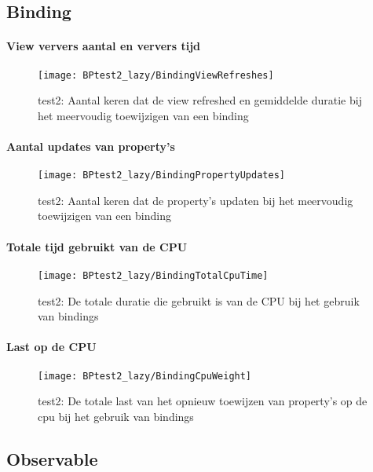 \subsection{Binding}
\paragraph{View ververs aantal en ververs tijd}
\begin{figure}[H]
    \centering
    \texttt{[image: BPtest2\_lazy/BindingViewRefreshes]} 
    \caption{test2: Aantal keren dat de view refreshed en gemiddelde duratie bij het meervoudig toewijzigen van een binding}
    \label{fig:viewRefreshesBinding2}
\end{figure}
\paragraph{Aantal updates van property's}
\begin{figure}[H]
    \centering
    \texttt{[image: BPtest2\_lazy/BindingPropertyUpdates]} 
    \caption{test2: Aantal keren dat de property's updaten bij het meervoudig toewijzigen van een binding}
    \label{fig:propertyUpdatesBinding2}
\end{figure}
\paragraph{Totale tijd gebruikt van de CPU}
\begin{figure}[H]
    \centering
    \texttt{[image: BPtest2\_lazy/BindingTotalCpuTime]} 
    \caption{test2: De totale duratie die gebruikt is van de CPU bij het gebruik van bindings}
    \label{fig:cpuUsageTimeBinding2}
\end{figure}
\paragraph{Last op de CPU}
\begin{figure}[H]
    \centering
    \texttt{[image: BPtest2\_lazy/BindingCpuWeight]} 
    \caption{test2: De totale last van het opnieuw toewijzen van property's op de cpu bij het gebruik van bindings}
    \label{fig:cpuWeightBinding2}
\end{figure}

\subsection{Observable}
